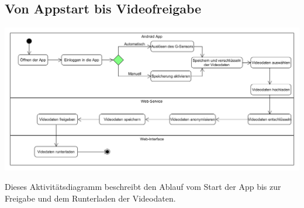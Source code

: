 \subsection{Von Appstart bis Videofreigabe}
\begin{center}
\includegraphics[width=1\textwidth]{subtopicsFuncspec/Res/systemModels/AKDiagramm.png}
\end{center}
Dieses Aktivitätsdiagramm beschreibt den Ablauf vom Start der App bis zur Freigabe und dem Runterladen der Videodaten. 
